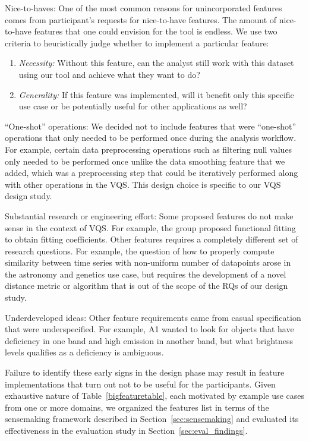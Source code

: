\begin{denselist}
\item Nice-to-haves: One of the most common reasons for unincorporated features comes from participant's requests for nice-to-have features. The amount of nice-to-have features that one could envision for the tool is endless. We use
two criteria to heuristically judge whether to implement a particular feature:
\begin{enumerate}[leftmargin=*]
\item \textit{Necessity:} Without this feature, can the analyst still work with this dataset using our tool and achieve what they want to do?
\item \textit{Generality:} If this feature was implemented, will it benefit only this specific use case or be potentially useful for other applications as well?
\end{enumerate}
\item ``One-shot'' operations: We decided not to include features that were ``one-shot'' operations that only needed to be performed once during the analysis workflow. For example, certain data preprocessing operations such as filtering null values only needed to be performed once unlike the data smoothing feature that we added, which was a preprocessing step that could be iteratively performed along with other operations in the VQS. This design choice is specific to our VQS design study.
\item Substantial research or engineering effort: Some proposed features do not make sense in the context of VQS. For example, the \matsci group proposed functional fitting to obtain fitting coefficients. Other features requires a completely different set of research questions. For example, the question of how to properly compute similarity between time series with non-uniform number of datapoints arose in the astronomy and genetics use case, but requires the development of a novel distance metric or algorithm that is out of the scope of the RQs of our design study.
\item Underdeveloped ideas: Other feature requirements came from casual specification that were underspecified. For example, A1 wanted to look for objects that have deficiency in one band and high emission in another band, but what brightness levels qualifies as a deficiency is ambiguous.
\end{denselist}
\par Failure to identify these early signs in the design phase may result in feature implementations that turn out not to be useful for the participants. Given exhaustive nature of Table~\ref{bigfeaturetable}, each motivated by example use cases from one or more domains, we organized the features list in terms of the sensemaking framework described in Section~\ref{sec:sensemaking} and evaluated its effectiveness in the evaluation study in Section~\ref{sec:eval_findings}.
